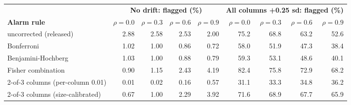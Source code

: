 \begin{tabular}{lrrrr@{\hspace{1.6em}}rrrr}
\toprule
 & \multicolumn{4}{c}{\textbf{No drift: flagged (\%)}} & \multicolumn{4}{c}{\textbf{All columns +0.25 sd: flagged (\%)}} \\
\cmidrule(lr){2-5}\cmidrule(lr){6-9}
\textbf{Alarm rule} & $\rho{=}0.0$ & $\rho{=}0.3$ & $\rho{=}0.6$ & $\rho{=}0.9$ & $\rho{=}0.0$ & $\rho{=}0.3$ & $\rho{=}0.6$ & $\rho{=}0.9$ \\
\midrule
uncorrected (released) & 2.88 & 2.58 & 2.53 & 2.00 & 75.2 & 68.8 & 63.2 & 52.6 \\
Bonferroni & 1.02 & 1.00 & 0.86 & 0.72 & 58.0 & 51.9 & 47.3 & 38.4 \\
Benjamini-Hochberg & 1.03 & 1.00 & 0.88 & 0.79 & 59.3 & 53.1 & 48.6 & 40.1 \\
Fisher combination & 0.90 & 1.15 & 2.43 & 4.19 & 82.4 & 75.8 & 72.9 & 68.2 \\
2-of-3 columns (per-column 0.01) & 0.01 & 0.02 & 0.16 & 0.57 & 31.1 & 33.3 & 34.8 & 36.2 \\
2-of-3 columns (size-calibrated) & 0.67 & 1.00 & 2.29 & 3.92 & 71.6 & 68.9 & 67.7 & 65.9 \\
\bottomrule
\end{tabular}
